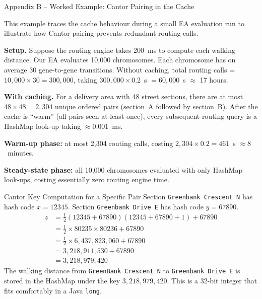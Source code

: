 \documentclass[aspectratio=169,10pt]{beamer}
\begin{document}
\begin{frame}[allowframebreaks]{Appendix B -- Worked Example: Cantor Pairing in the Cache}

  This example traces the cache behaviour during a small EA evaluation run
  to illustrate how Cantor pairing prevents redundant routing calls.

  \textbf{Setup.}  Suppose the routing engine takes 200~ms to compute each
  walking distance.  Our EA evaluates 10,000 chromosomes.  Each chromosome
  has on average 30 gene-to-gene transitions.  Without caching, total routing
  calls = $10,000 \times 30 = 300,000$, taking $300,000 \times 0.2$~s $=
  60,000$~s $\approx$ 17 hours.

  \textbf{With caching.}  For a delivery area with 48 street sections, there
  are at most $48 \times 48 = 2,304$ unique ordered pairs (section~A followed
  by section~B).  After the cache is ``warm'' (all pairs seen at least once),
  every subsequent routing query is a HashMap look-up taking $\approx 0.001$~ms.

  \textbf{Warm-up phase:} at most 2,304 routing calls, costing
  $2,304 \times 0.2 = 461$~s $\approx 8$~minutes.

  \textbf{Steady-state phase:} all 10,000 chromosomes evaluated with only
  HashMap look-ups, costing essentially zero routing engine time.

  \begin{exampleblock}{Cantor Key Computation for a Specific Pair}
    Section \texttt{Greenbank Crescent N} has hash code $x = 12345$.
    Section \texttt{Greenbank Drive E} has hash code $y = 67890$.
    \begin{align*}
      z &= \tfrac{1}{2}(12345 + 67890)(12345 + 67890 + 1) + 67890 \\
        &= \tfrac{1}{2} \times 80235 \times 80236 + 67890 \\
        &= \tfrac{1}{2} \times 6{,}437,823,060 + 67890 \\
        &= 3{,}218{,}911{,}530 + 67890 \\
        &= 3{,}218{,}979{,}420
    \end{align*}
    The walking distance from \texttt{GreenBank Crescent N} to
    \texttt{Greenbank Drive E} is stored in the HashMap under the key
    $3{,}218{,}979{,}420$.  This is a 32-bit integer that fits comfortably
    in a Java \texttt{long}.
  \end{exampleblock}

\end{frame}
\end{document}
